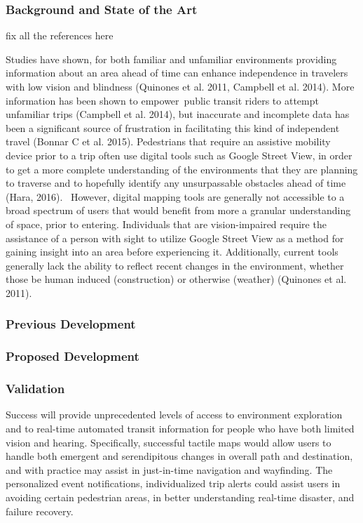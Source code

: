 
\subsubsection{Background and State of the Art}
\ac{fix all the references here}

Studies have shown, for both familiar and unfamiliar environments providing information about an area ahead of time can enhance independence in travelers with low vision and blindness (Quinones et al. 2011, Campbell et al. 2014).  More information has been shown to empower public transit riders to attempt unfamiliar trips (Campbell et al. 2014), but inaccurate and incomplete data has been a significant source of frustration in facilitating this kind of independent travel (Bonnar C et al. 2015).  Pedestrians that require an assistive mobility device prior to a trip often use digital tools such as Google Street View, in order to get a more complete understanding of the environments that they are planning to traverse and to hopefully identify any unsurpassable obstacles ahead of time (Hara, 2016).   However, digital mapping tools are generally not accessible to a broad spectrum of users that would benefit from more a granular understanding of space, prior to entering. Individuals that are vision-impaired require the assistance of a person with sight to utilize Google Street View as a method for gaining insight into an area before experiencing it.  Additionally, current tools generally lack the ability to reflect recent changes in the environment, whether those be human induced (construction) or otherwise (weather) (Quinones et al. 2011).


\subsubsection{Previous Development}

\subsubsection{Proposed Development}

\subsubsection{Validation}
Success will provide unprecedented levels of access to environment exploration and to real-time automated transit information for people who have both limited vision and hearing. Specifically, successful tactile maps would allow users to handle both emergent and serendipitous changes in overall path and destination, and with practice may assist in just-in-time navigation and wayfinding.
The personalized event notifications, individualized trip alerts could assist users in avoiding certain pedestrian areas, in better understanding real-time disaster, and failure recovery.